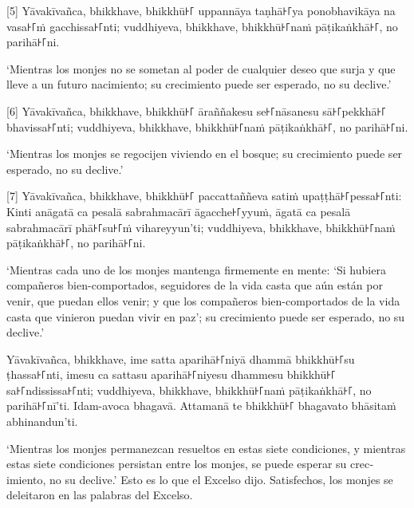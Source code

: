\enlargethispage{2\baselineskip}

[5] Yāvakīvañca, bhikkhave, bhikkhū꜔꜒ uppannāya taṇhā꜔꜒ya ponobhavikāya na vasa꜔꜒ṁ
gacchissa꜔꜒nti; vuddhiyeva, bhikkhave, bhikkhū꜔꜒naṁ pāṭikaṅkhā꜔꜒, no parihā꜔꜒ni.

\begin{english}
  `Mientras los monjes no se sometan al poder de cualquier deseo que surja y
  que lleve a un futuro nacimiento; su crecimiento puede ser
  esperado, no su declive.'
\end{english}

[6] Yāvakīvañca, bhikkhave, bhikkhū꜔꜒ āraññakesu se꜔꜒nāsanesu sā꜔꜒pekkhā꜔꜒ bhavissa꜔꜒nti;
vuddhiyeva, bhikkhave, bhikkhū꜔꜒naṁ pāṭikaṅkhā꜔꜒, no parihā꜔꜒ni.

\begin{english}
  `Mientras los monjes se regocijen viviendo en el bosque;
  su crecimiento puede ser esperado, no su declive.'
\end{english}

[7] Yāvakīvañca, bhikkhave, bhikkhū꜔꜒ paccattaññeva satiṁ upaṭṭhā꜔꜒pessa꜔꜒nti: Kinti
anāgatā ca pesalā sabrahmacārī āgacche꜔꜒yyuṁ, āgatā ca pesalā sabrahmacārī phā꜔꜒su꜔꜒ṁ
vihareyyun'ti; vuddhiyeva, bhikkhave, bhikkhū꜔꜒naṁ pāṭikaṅkhā꜔꜒, no parihā꜔꜒ni.

\begin{english}
  `Mientras cada uno de los monjes mantenga firmemente en mente: `Si hubiera
  compañeros bien-comportados, seguidores de la vida casta que aún están por
  venir, que puedan ellos venir; y que los compañeros bien-comportados de la vida casta
  que vinieron puedan vivir en paz'; su crecimiento puede ser esperado, no su declive.'
\end{english}

Yāvakīvañca, bhikkhave, ime satta aparihā꜔꜒niyā dhammā bhikkhū꜔꜒su ṭhassa꜔꜒nti, imesu
ca sattasu aparihā꜔꜒niyesu dhammesu bhikkhū꜔꜒ sa꜔꜒ndississa꜔꜒nti; vuddhiyeva, bhikkhave,
bhikkhū꜔꜒naṁ pāṭikaṅkhā꜔꜒, no parihā꜔꜒nī'ti. Idam-avoca bhagavā. Attamanā te bhikkhū꜔꜒
bhagavato bhāsitaṁ abhinandun'ti.

\begin{english}
  `Mientras los monjes permanezcan resueltos en estas siete condiciones, y mientras
  estas siete condiciones persistan entre los monjes, se puede esperar su
  crecimiento, no su declive.' Esto es lo que el Excelso dijo. Satisfechos,
  los monjes se deleitaron en las palabras del Excelso.
\end{english}
